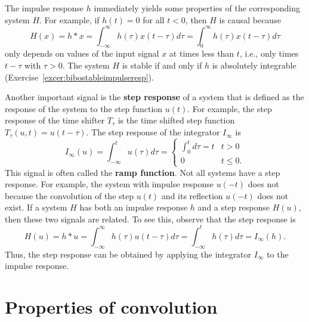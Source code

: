 \documentclass[11pt,a4paper]{book}
\theoremstyle{plain}
\numberwithin{equation}{section}
\newcommand{\reals}{{\mathbb R}}
\newcommand{\term}{\textbf}
\begin{document}


The impulse response $h$ immediately yields some properties of the corresponding system $H$.  For example, if $h(t) = 0$ for all $t < 0$, then $H$ is causal because 
\[
H(x) = h * x =  \int_{-\infty}^{\infty} h(\tau) x(t - \tau) d\tau = \int_{0}^{\infty} h(\tau) x(t - \tau) d\tau
\] 
only depends on values of the input signal $x$ at times less than $t$, i.e., only times $t - \tau$ with $\tau > 0$.  The system $H$ is stable if and only if $h$ is absolutely integrable (Exercise~\ref{excer:bibostableimpulseresp}).

Another important signal is the \term{step response} of a system that is defined as the response of the system to the step function $u(t)$.  For example, the step response of the time shifter $T_\tau$ is the time shifted step function $T_\tau(u,t) = u(t - \tau)$.  The step response of the integrator $I_\infty$ is
\[
I_\infty(u) = \int_{-\infty}^t u(\tau) d\tau = \begin{cases}
\int_{0}^t d\tau  = t & t > 0 \\
0 & t \leq 0.
\end{cases}
\]
This signal is often called the \term{ramp function}.  Not all systems have a step response.  For example, the system with impulse response $u(-t)$ does not because the convolution of the step $u(t)$ and its reflection $u(-t)$ does not exist.  If a system $H$ has both an impulse response $h$ and a step response $H(u)$, then these two signals are related.  To see this, observe that the step response is
\begin{equation}\label{eq:stepresponseintegrateimpulseresponse}
H(u) = h * u = \int_{-\infty}^{\infty}h(\tau)u(t - \tau) d\tau = \int_{-\infty}^{t} h(\tau) d\tau = I_\infty(h). 
\end{equation}
Thus, the step response can be obtained by applying the integrator $I_\infty$ to the impulse response.

\section{Properties of convolution}\label{sec:prop-conv}
\end{document}
